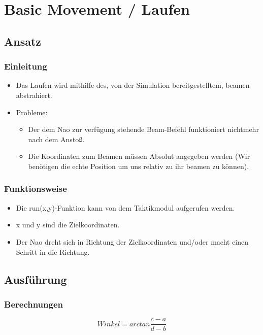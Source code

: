 \section{Basic Movement / Laufen}

\subsection{Ansatz}
\frame
{
	\frametitle{Einleitung}
	\begin{itemize}
		\item Das Laufen wird mithilfe des, von der Simulation bereitgestelltem, beamen abstrahiert.
		\item Probleme:
		\begin{itemize}
			\item Der dem Nao zur verfügung stehende Beam-Befehl funktioniert nichtmehr nach dem Anstoß.
			\item Die Koordinaten zum Beamen müssen Absolut angegeben werden (Wir benötigen die echte Position um uns relativ zu ihr beamen zu können).
		\end{itemize}
	\end{itemize}
}

\frame
{
	\frametitle{Funktionsweise}
	\begin{itemize}
		\item Die run(x,y)-Funktion kann von dem Taktikmodul aufgerufen werden.
		\item x und y sind die Zielkoordinaten.
		\item Der Nao dreht sich in Richtung der Zielkoordinaten und/oder macht einen Schritt in die Richtung.
	\end{itemize}
}

\subsection{Ausführung}
\frame
{
	\frametitle{Berechnungen}
	\begin{equation}
		Winkel = arctan\frac{c-a}{d-b}
	\end{equation}
}

